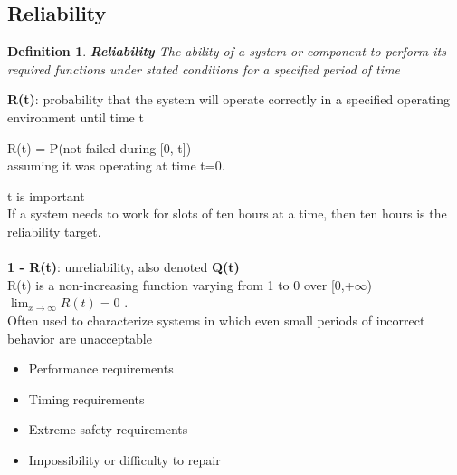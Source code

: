 \documentclass[10pt, oneside]{article}
\newcommand{\R}{\mathbb{R}}
\newtheorem{defn}{Definition}
\begin{document}
\subsection{Reliability}
\begin{defn}
    {\bf Reliability} The ability of a system or component to perform its required functions under stated conditions for a specified period of time
\end{defn}{\bf R(t)}: probability that the system will operate correctly in a specified operating environment until time t\begin{center}
    R(t) = P(not failed during [0, t])\\assuming it was operating at time t=0.
\end{center} 
t is important\\
If a system needs to work for slots of ten hours at a time, then ten hours is the reliability target.\\\\{\bf 1 - R(t)}: unreliability, also denoted {\bf Q(t)}\\R(t) is a non-increasing function varying from 1 to 0 over [0,+$\infty$)            $\lim_{x\to\infty} R(t)= 0$ .\\Often used to characterize systems in which even small periods of incorrect behavior are unacceptable\begin{itemize}
    \item Performance requirements
    \item Timing requirements
    \item Extreme safety requirements
    \item Impossibility or difficulty to repair
\end{itemize}
\end{document}
